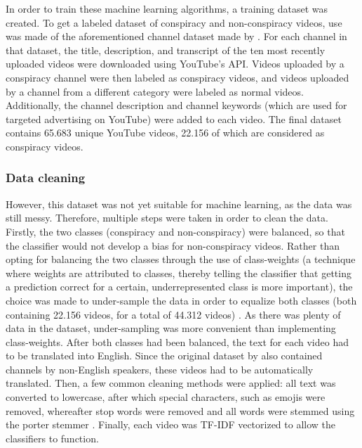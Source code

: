 \documentclass[../main.tex]{subfiles}
\begin{document}
In order to train these machine learning algorithms, a training dataset was created. To get a labeled
dataset of conspiracy and non-conspiracy videos, use was made of the aforementioned channel dataset made
by \citet{ledwich2019algorithmic}. For each channel in that dataset, the title, description, and
transcript of the ten most recently uploaded videos were downloaded using YouTube's API. Videos uploaded
by a conspiracy channel were then labeled as conspiracy videos, and videos uploaded by a channel from a
different category were labeled as normal videos. Additionally, the channel description and channel
keywords (which are used for targeted advertising on YouTube) were added to each video. The final
dataset contains 65.683 unique YouTube videos, 22.156 of which are considered as conspiracy videos. 

\subsubsection{Data cleaning}
However, this dataset was not yet suitable for machine learning, as the data was still messy. Therefore,
multiple steps were taken in order to clean the data. Firstly, the two classes (conspiracy and
non-conspiracy) were balanced, so that the classifier would not develop a bias for non-conspiracy
videos. Rather than opting for balancing the two classes through the use of class-weights (a technique
where weights are attributed to classes, thereby telling the classifier that getting a prediction
correct for a certain, underrepresented class is more important), the choice
was made to under-sample the data in order to equalize both classes (both containing 22.156 videos, for
a total of 44.312 videos) \citep{lemaitre2017imbalanced, sun2006boosting}. As there was plenty of data
in the dataset, under-sampling was more convenient than implementing class-weights. After both classes
had been balanced, the text for each video had to be translated into English. Since the original dataset
by \citet{ledwich2019algorithmic} also contained channels by non-English speakers, these videos had to
be automatically translated. Then, a few common cleaning methods were applied: all text was converted to
lowercase, after which special characters, such as emojis were removed, whereafter stop words were
removed and all words were stemmed using the porter stemmer \citep{karaa2013new}. Finally, each video
was TF-IDF vectorized to allow the classifiers to function.
\end{document}
